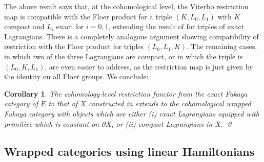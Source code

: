 \documentclass{article}
\theoremstyle{plain}%
\newtheorem{cor}[thm]{Corollary}
\theoremstyle{definition}
\numberwithin{equation}{section}
\numberwithin{figure}{section}
\begin{document}
  The above result says that, at the cohomological level, the Viterbo restriction map is compatible with the Floer product for a triple $(K,L_0,L_1)$ with $K$ compact and $L_i$ exact for $i = 0,1$, extending the result of \cite{AS} for triples of exact Lagrangians. There is a completely analogous argument showing compatibility of restriction with the Floer product for triples $(L_0,L_1,K)$. The remaining cases, in which two of the three Lagrangians are compact, or in which the triple is $(L_0,K,L_1)$, are even easier to address, as the restriction map is just given by the identity on all Floer groups. We conclude:
  \begin{cor} \label{cor:cohomology_restriction}
The cohomology-level restriction functor from the exact Fukaya category of $E$ to that of $X$  constructed in \cite{AS} extends to the cohomological wrapped Fukaya category with objects which are either (i) exact Lagrangians equipped with primitive which is constant on $\partial X$, or (ii) compact Lagrangians in $X$. \qed
  \end{cor}


\subsection{Wrapped categories using linear Hamiltonians}
\label{sec:wrapp-categ-using}
\end{document}
